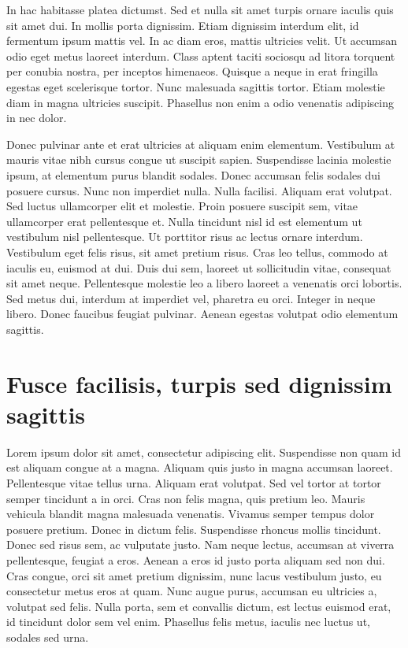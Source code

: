 \documentclass{EPUProjetDi}
\begin{document}
In hac habitasse platea dictumst. Sed et nulla sit amet turpis ornare iaculis quis sit amet dui. In mollis porta dignissim. Etiam dignissim interdum elit, id fermentum ipsum mattis vel. In ac diam eros, mattis ultricies velit. Ut accumsan odio eget metus laoreet interdum. Class aptent taciti sociosqu ad litora torquent per conubia nostra, per inceptos himenaeos. Quisque a neque in erat fringilla egestas eget scelerisque tortor. Nunc malesuada sagittis tortor. Etiam molestie diam in magna ultricies suscipit. Phasellus non enim a odio venenatis adipiscing in nec dolor.

Donec pulvinar ante et erat ultricies at aliquam enim elementum. Vestibulum at mauris vitae nibh cursus congue ut suscipit sapien. Suspendisse lacinia molestie ipsum, at elementum purus blandit sodales. Donec accumsan felis sodales dui posuere cursus. Nunc non imperdiet nulla. Nulla facilisi. Aliquam erat volutpat. Sed luctus ullamcorper elit et molestie. Proin posuere suscipit sem, vitae ullamcorper erat pellentesque et. Nulla tincidunt nisl id est elementum ut vestibulum nisl pellentesque. Ut porttitor risus ac lectus ornare interdum. Vestibulum eget felis risus, sit amet pretium risus. Cras leo tellus, commodo at iaculis eu, euismod at dui. Duis dui sem, laoreet ut sollicitudin vitae, consequat sit amet neque. Pellentesque molestie leo a libero laoreet a venenatis orci lobortis. Sed metus dui, interdum at imperdiet vel, pharetra eu orci. Integer in neque libero. Donec faucibus feugiat pulvinar. Aenean egestas volutpat odio elementum sagittis.

\section{Fusce facilisis, turpis sed dignissim sagittis}

Lorem ipsum dolor sit amet, consectetur adipiscing elit. Suspendisse non quam id est aliquam congue at a magna. Aliquam quis justo in magna accumsan laoreet. Pellentesque vitae tellus urna. Aliquam erat volutpat. Sed vel tortor at tortor semper tincidunt a in orci. Cras non felis magna, quis pretium leo. Mauris vehicula blandit magna malesuada venenatis. Vivamus semper tempus dolor posuere pretium. Donec in dictum felis. Suspendisse rhoncus mollis tincidunt. Donec sed risus sem, ac vulputate justo. Nam neque lectus, accumsan at viverra pellentesque, feugiat a eros. Aenean a eros id justo porta aliquam sed non dui. Cras congue, orci sit amet pretium dignissim, nunc lacus vestibulum justo, eu consectetur metus eros at quam. Nunc augue purus, accumsan eu ultricies a, volutpat sed felis. Nulla porta, sem et convallis dictum, est lectus euismod erat, id tincidunt dolor sem vel enim. Phasellus felis metus, iaculis nec luctus ut, sodales sed urna.
\end{document}
